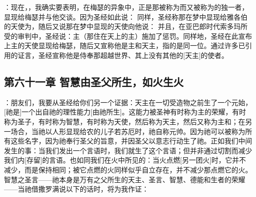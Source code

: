 ：现在，，我确实要表明，在梅瑟的异象中，正是那被称为而又被称为的独一者，显现给梅瑟并与他交谈。因为圣经如此说： 同样，圣经称那在梦中显现给雅各伯的天使为，随后又说那在梦中显现的天使向他说： 并且，在亚巴郎时代索多玛所受的审判中，圣经说：主（那住在天上的主）施加了惩罚。同样地，圣经在此宣布上主的天使显现给梅瑟，随后又宣称他是主和天主，指的是同一位。通过许多已引用的证言，圣经宣称他是侍奉那超越世界、其上没有其他的[天主]的使者。\par


\subsection{第六十一章 智慧由圣父所生，如火生火}

：朋友们，我要从圣经给你们另一个证据：天主在一切受造物之前生了一个元始，[祂是]一个出自祂的理性能力[由祂所生]。这能力被圣神有时称为主的荣耀，有时称为圣子，有时称为智慧，有时称为天使，然后称为天主，然后又称为主和；在另一场合，当祂以人形显现给农的儿子若苏厄时，祂自称元帅。因为祂可以被称为所有这些名字，因为祂奉行圣父的旨意，并因圣父以意志行动生了祂。正如我们中间发生的事：当我们发出一个言语时，我们就生了这个言语；但并非通过切割而减少我们内[存留]的言语。也如同我们在火中所见的：当火点燃[另一团火]时，它并不减少，而是保持相同；被它点燃的火同样似乎自立存在，并不减少那点燃它的火。智慧之圣言——祂本身是万有之父所生的天主、圣言、智慧、德能和生者的荣耀——当祂借撒罗满说以下的话时，将为我作证：\par

\par

